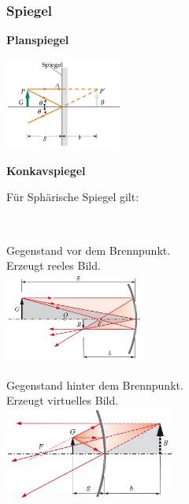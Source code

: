 \subsubsection{Spiegel}

\textbf{Planspiegel}
\begin{center}
	\includegraphics[height=3cm,keepaspectratio=true]{Images/planspiegel.png}
\end{center}


\textbf{Konkavspiegel}

\begin{center}
	\begin{minipage}{0.3\textwidth}
		Für Sphärische Spiegel gilt:
	\end{minipage}%
	\begin{minipage}{0.3\textwidth}
		 \\
	\end{minipage}
\end{center}

\begin{center}
	\begin{minipage}{0.3\textwidth}
		Gegenstand vor dem Brennpunkt. \\
		Erzeugt reeles Bild. \\
		\includegraphics[height=3cm,keepaspectratio=true]{Images/konkavspiegel1.png}
	\end{minipage}%
	\begin{minipage}{0.3\textwidth}
		Gegenstand hinter dem Brennpunkt. \\
		Erzeugt virtuelles Bild. \\
		\includegraphics[height=3cm,keepaspectratio=true]{Images/konkavspiegel2.png}
	\end{minipage}
\end{center}


